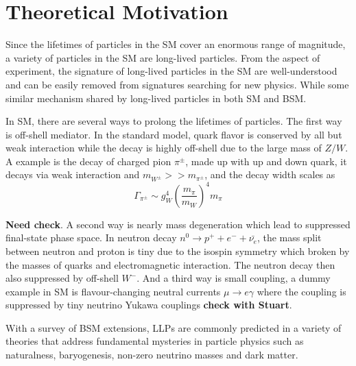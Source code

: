 \section{Theoretical Motivation}
Since the lifetimes of particles in the SM cover an enormous range of magnitude, a variety of particles in the SM are long-lived particles. From the aspect of experiment, the signature of long-lived particles in the SM are well-understood and can be easily removed from signatures searching for new physics. While some similar mechanism  shared by long-lived particles in both SM and BSM. 

In SM, there are several ways to prolong the lifetimes of particles. The first way is off-shell mediator. In the standard model, quark flavor is conserved by all but weak interaction while the decay is highly off-shell due to the large mass of $Z/W$. A example is the decay of charged pion $\pi^{\pm}$, made up with up and down quark, it decays via weak interaction and $m_{W^{\pm}} >> m_{\pi^{\pm}}$, and the decay width scales as 
\begin{equation}
   \Gamma_{\pi^{\pm}} \sim g_{W}^4 (\frac{m_{\pi}}{m_W})^{4} m_{\pi}
\end{equation}

\textbf{Need check}. A second way is nearly mass degeneration which lead to suppressed final-state phase space. In neutron decay $ n^0 \rightarrow p^+ + e^- + \bar{\nu_{e}}$, the mass split between neutron and proton is tiny  due to the isospin symmetry which broken by the masses of quarks and electromagnetic interaction. The neutron decay then also suppressed by off-shell $W^-$. And a third way is small coupling,  a dummy example in SM is flavour-changing neutral currents $\mu \rightarrow e \gamma $ where the coupling is suppressed by tiny neutrino Yukawa couplings \textbf{check with Stuart}. 

With a survey of BSM extensions, LLPs are commonly predicted in a variety of theories that address fundamental mysteries in particle physics such as naturalness, baryogenesis, non-zero neutrino masses and dark matter.

